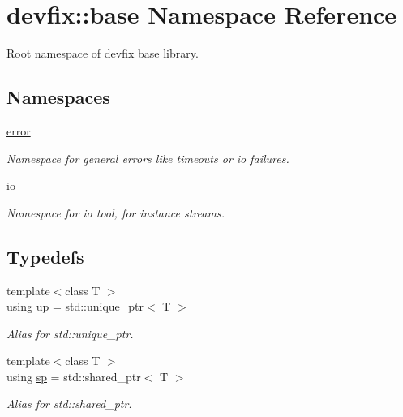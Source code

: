 \hypertarget{namespacedevfix_1_1base}{}\section{devfix\+:\+:base Namespace Reference}
\label{namespacedevfix_1_1base}


Root namespace of devfix base library.  


\subsection*{Namespaces}
\begin{DoxyCompactItemize}
\item 
 \hyperlink{namespacedevfix_1_1base_1_1error}{error}
\begin{DoxyCompactList}\small\item\em Namespace for general errors like timeouts or io failures. \end{DoxyCompactList}\item 
 \hyperlink{namespacedevfix_1_1base_1_1io}{io}
\begin{DoxyCompactList}\small\item\em Namespace for io tool, for instance streams. \end{DoxyCompactList}\end{DoxyCompactItemize}
\subsection*{Typedefs}
\begin{DoxyCompactItemize}
\item 
{\footnotesize template$<$class T $>$ }\\using \hyperlink{namespacedevfix_1_1base_a18dfbd492717795cee1cfa6f14a8f724}{up} = std\+::unique\+\_\+ptr$<$ T $>$
\begin{DoxyCompactList}\small\item\em Alias for std\+::unique\+\_\+ptr. \end{DoxyCompactList}\item 
{\footnotesize template$<$class T $>$ }\\using \hyperlink{namespacedevfix_1_1base_ad239a07977b9e77ffabaf558636d0b8b}{sp} = std\+::shared\+\_\+ptr$<$ T $>$
\begin{DoxyCompactList}\small\item\em Alias for std\+::shared\+\_\+ptr. \end{DoxyCompactList}\end{DoxyCompactItemize}


